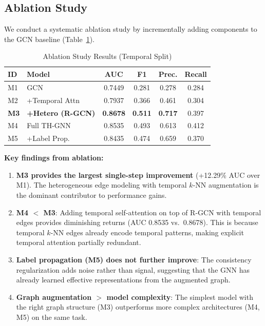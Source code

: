 \subsection{Ablation Study}

We conduct a systematic ablation study by incrementally adding components to the GCN baseline (Table~\ref{tab:ablation}).

\begin{table}[h]
\centering
\caption{Ablation Study Results (Temporal Split)}
\label{tab:ablation}
\begin{tabular}{llcccc}
\toprule
\textbf{ID} & \textbf{Model} & \textbf{AUC} & \textbf{F1} & \textbf{Prec.} & \textbf{Recall} \\
\midrule
M1 & GCN & 0.7449 & 0.281 & 0.278 & 0.284 \\
M2 & +Temporal Attn & 0.7937 & 0.366 & 0.461 & 0.304 \\
\textbf{M3} & \textbf{+Hetero (R-GCN)} & \textbf{0.8678} & \textbf{0.511} & \textbf{0.717} & 0.397 \\
M4 & Full TH-GNN & 0.8535 & 0.493 & 0.613 & 0.412 \\
M5 & +Label Prop. & 0.8435 & 0.474 & 0.659 & 0.370 \\
\bottomrule
\end{tabular}
\end{table}

\textbf{Key findings from ablation:}

\begin{enumerate}
    \item \textbf{M3 provides the largest single-step improvement} (+12.29\% AUC over M1). The heterogeneous edge modeling with temporal $k$-NN augmentation is the dominant contributor to performance gains.

    \item \textbf{M4 $<$ M3}: Adding temporal self-attention on top of R-GCN with temporal edges provides diminishing returns (AUC 0.8535 vs.\ 0.8678). This is because temporal $k$-NN edges already encode temporal patterns, making explicit temporal attention partially redundant.

    \item \textbf{Label propagation (M5) does not further improve}: The consistency regularization adds noise rather than signal, suggesting that the GNN has already learned effective representations from the augmented graph.

    \item \textbf{Graph augmentation $>$ model complexity}: The simplest model with the right graph structure (M3) outperforms more complex architectures (M4, M5) on the same task.
\end{enumerate}

